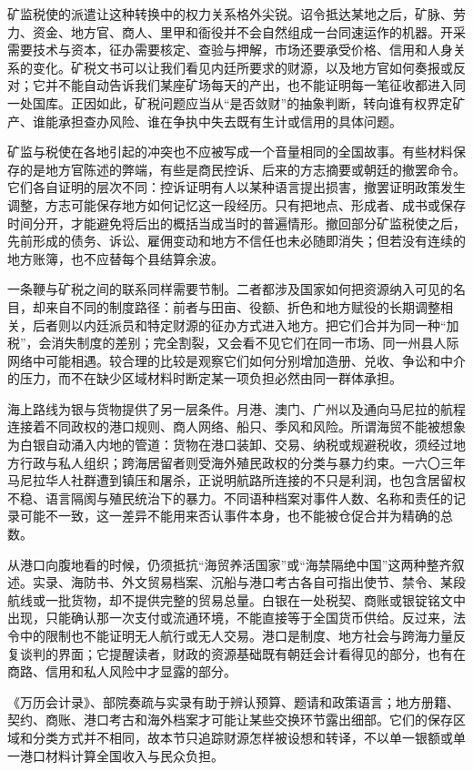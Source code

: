 矿监税使的派遣让这种转换中的权力关系格外尖锐。诏令抵达某地之后，矿脉、劳力、资金、地方官、商人、里甲和衙役并不会自然组成一台同速运作的机器。开采需要技术与资本，征办需要核定、查验与押解，市场还要承受价格、信用和人身关系的变化。矿税文书可以让我们看见内廷所要求的财源，以及地方官如何奏报或反对；它并不能自动告诉我们某座矿场每天的产出，也不能证明每一笔征收都进入同一处国库。正因如此，矿税问题应当从“是否敛财”的抽象判断，转向谁有权界定矿产、谁能承担查办风险、谁在争执中失去既有生计或信用的具体问题。

矿监与税使在各地引起的冲突也不应被写成一个音量相同的全国故事。有些材料保存的是地方官陈述的弊端，有些是商民控诉、后来的方志摘要或朝廷的撤罢命令。它们各自证明的层次不同：控诉证明有人以某种语言提出损害，撤罢证明政策发生调整，方志可能保存地方如何记忆这一段经历。只有把地点、形成者、成书或保存时间分开，才能避免将后出的概括当成当时的普遍情形。撤回部分矿监税使之后，先前形成的债务、诉讼、雇佣变动和地方不信任也未必随即消失；但若没有连续的地方账簿，也不应替每个县结算余波。

一条鞭与矿税之间的联系同样需要节制。二者都涉及国家如何把资源纳入可见的名目，却来自不同的制度路径：前者与田亩、役额、折色和地方赋役的长期调整相关，后者则以内廷派员和特定财源的征办方式进入地方。把它们合并为同一种“加税”，会消失制度的差别；完全割裂，又会看不见它们在同一市场、同一州县人际网络中可能相遇。较合理的比较是观察它们如何分别增加造册、兑收、争讼和中介的压力，而不在缺少区域材料时断定某一项负担必然由同一群体承担。

海上路线为银与货物提供了另一层条件。月港、澳门、广州以及通向马尼拉的航程连接着不同政权的港口规则、商人网络、船只、季风和风险。所谓海贸不能被想象为白银自动涌入内地的管道：货物在港口装卸、交易、纳税或规避税收，须经过地方行政与私人组织；跨海居留者则受海外殖民政权的分类与暴力约束。一六〇三年马尼拉华人社群遭到镇压和屠杀，正说明航路所连接的不只是利润，也包含居留权不稳、语言隔阂与殖民统治下的暴力。不同语种档案对事件人数、名称和责任的记录可能不一致，这一差异不能用来否认事件本身，也不能被仓促合并为精确的总数。

从港口向腹地看的时候，仍须抵抗“海贸养活国家”或“海禁隔绝中国”这两种整齐叙述。实录、海防书、外文贸易档案、沉船与港口考古各自可指出使节、禁令、某段航线或一批货物，却不提供完整的贸易总量。白银在一处税契、商账或银锭铭文中出现，只能确认那一次支付或流通环境，不能直接等于全国货币供给。反过来，法令中的限制也不能证明无人航行或无人交易。港口是制度、地方社会与跨海力量反复谈判的界面；它提醒读者，财政的资源基础既有朝廷会计看得见的部分，也有在商路、信用和私人风险中才显露的部分。

\begin{sourcenote}[财源、贸易与地方经验之间的距离]
《万历会计录》、部院奏疏与实录有助于辨认预算、题请和政策语言；地方册籍、契约、商账、港口考古和海外档案才可能让某些交换环节露出细部。它们的保存区域和分类方式并不相同，故本节只追踪财源怎样被设想和转译，不以单一银额或单一港口材料计算全国收入与民众负担。
\end{sourcenote}

